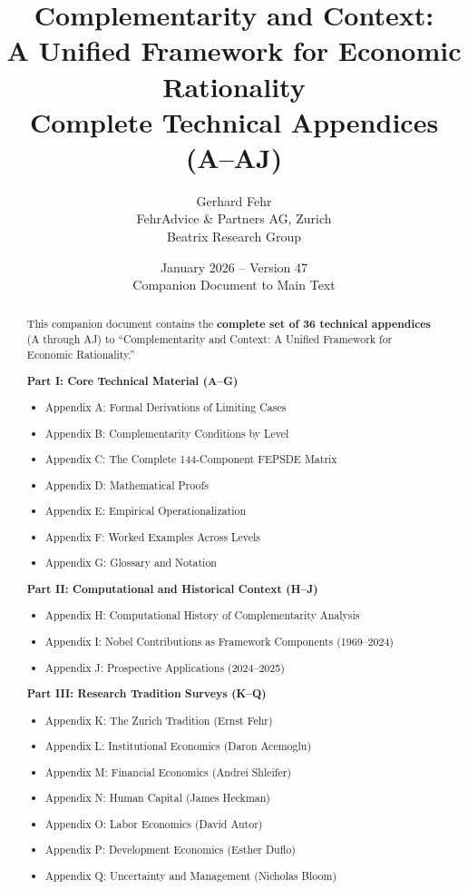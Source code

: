 \documentclass[12pt,a4paper]{article}
\title{Complementarity and Context:\\
A Unified Framework for Economic Rationality\\[1em]
\Large\textbf{Complete Technical Appendices (A--AJ)}}
\author{Gerhard Fehr\\
FehrAdvice \& Partners AG, Zurich\\
Beatrix Research Group}
\date{January 2026 -- Version 47\\[1em]
\small Companion Document to Main Text}
\begin{document}
\maketitle

\begin{abstract}
This companion document contains the \textbf{complete set of 36 technical appendices} (A through AJ) to ``Complementarity and Context: A Unified Framework for Economic Rationality.''

\textbf{Part I: Core Technical Material (A--G)}
\begin{itemize}[noitemsep]
    \item Appendix A: Formal Derivations of Limiting Cases
    \item Appendix B: Complementarity Conditions by Level
    \item Appendix C: The Complete 144-Component FEPSDE Matrix
    \item Appendix D: Mathematical Proofs
    \item Appendix E: Empirical Operationalization
    \item Appendix F: Worked Examples Across Levels
    \item Appendix G: Glossary and Notation
\end{itemize}

\textbf{Part II: Computational and Historical Context (H--J)}
\begin{itemize}[noitemsep]
    \item Appendix H: Computational History of Complementarity Analysis
    \item Appendix I: Nobel Contributions as Framework Components (1969--2024)
    \item Appendix J: Prospective Applications (2024--2025)
\end{itemize}

\textbf{Part III: Research Tradition Surveys (K--Q)}
\begin{itemize}[noitemsep]
    \item Appendix K: The Zurich Tradition (Ernst Fehr)
    \item Appendix L: Institutional Economics (Daron Acemoglu)
    \item Appendix M: Financial Economics (Andrei Shleifer)
    \item Appendix N: Human Capital (James Heckman)
    \item Appendix O: Labor Economics (David Autor)
    \item Appendix P: Development Economics (Esther Duflo)
    \item Appendix Q: Uncertainty and Management (Nicholas Bloom)
\end{itemize}


\end{abstract}
\end{document}
